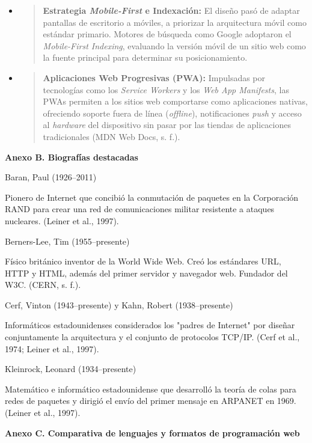 \begin{itemize}
\item
  \begin{quote}
  \textbf{Estrategia \emph{Mobile-First} e Indexación:} El diseño pasó
  de adaptar pantallas de escritorio a móviles, a priorizar la
  arquitectura móvil como estándar primario. Motores de búsqueda como
  Google adoptaron el \emph{Mobile-First Indexing}, evaluando la versión
  móvil de un sitio web como la fuente principal para determinar su
  posicionamiento.
  \end{quote}
\item
  \begin{quote}
  \textbf{Aplicaciones Web Progresivas (PWA):} Impulsadas por
  tecnologías como los \emph{Service Workers} y los \emph{Web App
  Manifests}, las PWAs permiten a los sitios web comportarse como
  aplicaciones nativas, ofreciendo soporte fuera de línea
  (\emph{offline}), notificaciones \emph{push} y acceso al
  \emph{hardware} del dispositivo sin pasar por las tiendas de
  aplicaciones tradicionales (MDN Web Docs, s. f.).
  \end{quote}
\end{itemize}

\textbf{Anexo B. Biografías destacadas}

Baran, Paul (1926--2011)

Pionero de Internet que concibió la conmutación de paquetes en la
Corporación RAND para crear una red de comunicaciones militar resistente
a ataques nucleares. (Leiner et al., 1997).

Berners-Lee, Tim (1955--presente)

Físico británico inventor de la World Wide Web. Creó los estándares URL,
HTTP y HTML, además del primer servidor y navegador web. Fundador del
W3C. (CERN, s. f.).

Cerf, Vinton (1943--presente) y Kahn, Robert (1938--presente)

Informáticos estadounidenses considerados los "padres de Internet" por
diseñar conjuntamente la arquitectura y el conjunto de protocolos
TCP/IP. (Cerf et al., 1974; Leiner et al., 1997).

Kleinrock, Leonard (1934--presente)

Matemático e informático estadounidense que desarrolló la teoría de
colas para redes de paquetes y dirigió el envío del primer mensaje en
ARPANET en 1969. (Leiner et al., 1997).

\textbf{Anexo C. Comparativa de lenguajes y formatos de programación
web}

